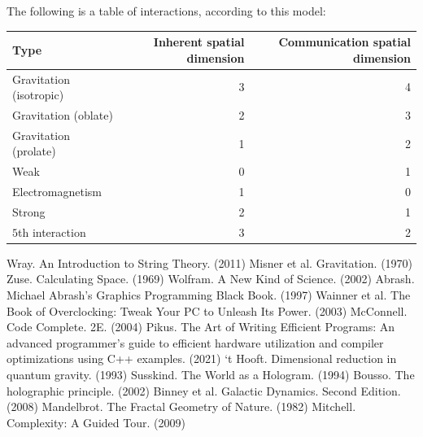 \documentclass[12pt]{article}
\begin{document}
{The following is a table of interactions, according to this model:
\begin{center}
\begin{tabular}{| l | r | r |}
  \hline
  Type & Inherent spatial dimension & Communication spatial dimension \\
\hline
\hline
Gravitation (isotropic) & 3  & 4\\
Gravitation (oblate) & 2 & 3\\
Gravitation (prolate) & 1 & 2\\
Weak & 0 & 1\\
Electromagnetism & 1 & 0 \\
Strong & 2 & 1\\
$5$th interaction & 3 & 2 \\
  \hline  
\end{tabular}
\end{center}







\pagebreak




\begin{thebibliography}{9}

 Wray. An Introduction to String Theory. (2011)
 Misner et al. Gravitation. (1970)
 Zuse. Calculating Space. (1969)
 Wolfram. A New Kind of Science. (2002)
 Abrash. Michael Abrash's Graphics Programming Black Book. (1997)
 Wainner et al. The Book of Overclocking: Tweak Your PC to Unleash Its Power. (2003)
 McConnell. Code Complete. 2E. (2004)
 Pikus. The Art of Writing Efficient Programs: An advanced programmer's guide to efficient hardware utilization and compiler optimizations using C++ examples. (2021)
 `t Hooft. Dimensional reduction in quantum gravity. (1993)
 Susskind. The World as a Hologram. (1994)
 Bousso. The holographic principle. (2002)
 Binney et al. Galactic Dynamics. Second Edition. (2008)
 Mandelbrot. The Fractal Geometry of Nature. (1982)
 Mitchell. Complexity: A Guided Tour. (2009)






\end{thebibliography}}
\end{document}
